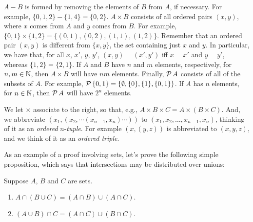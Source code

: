 $A-B$ is formed by removing the elements of $B$ from $A$, if
necessary.  For example, $\{0,1,2\}-\{1,4\}=\{0,2\}$.
$A\times B$ consists of all ordered pairs $(x,y)$,
%
%
where $x$ comes from $A$ and $y$ comes from $B$.  For example,
$\{0,1\}\times\{1,2\}=\{(0,1),(0,2),(1,1),(1,2)\}$.  Remember that an
ordered pair $(x,y)$ is different from $\{x,y\}$, the set containing
just $x$ and $y$.  In particular, we have that, for all
$x$, $x'$, $y$, $y'$, $(x,y)=(x',y')$ iff
$x=x'$ and $y=y'$, whereas $\{1,2\}=\{2,1\}$.
If $A$ and $B$ have $n$ and $m$ elements, respectively, for
$n,m\in\mathbb{N}$, then $A\times B$ will have $nm$ elements.  Finally,
${\cal P} \,A$ consists of all of the subsets of $A$.  For example,
${\cal P} \,\{0,1\}=\{\emptyset,\{0\},\{1\},\{0,1\}\}$.  If $A$ has $n$
elements, for $n\in\mathbb{N}$, then ${\cal P} \,A$ will have $2^n$ elements.

We let $\times$ associate to the right, so that, e.g.,
%
%
$A\times B\times C = A\times(B\times C)$.  And, we abbreviate
$(x_1,(x_2,\cdots(x_{n-1},x_n)\cdots))$ to
$(x_1,x_2,\ldots,x_{n-1},x_n)$, thinking of it as an \emph{ordered}
$n$-\emph{tuple}.
%
For example
$(x,(y,z))$ is abbreviated to $(x,y,z)$, and we think of it
as an \emph{ordered triple}.
%
%

As an example of a proof involving sets, let's prove
the following simple proposition, which says that intersections
may be distributed over unions:
%

\begin{proposition}
\label{InterOverUnionProp}
Suppose $A$, $B$ and $C$ are sets.

\begin{enumerate}[\quad(1)]
\item $A\cap(B\cup C)=(A\cap B)\cup(A\cap C)$.

\item $(A\cup B)\cap C=(A\cap C)\cup(B\cap C)$.
\end{enumerate}
\end{proposition}

